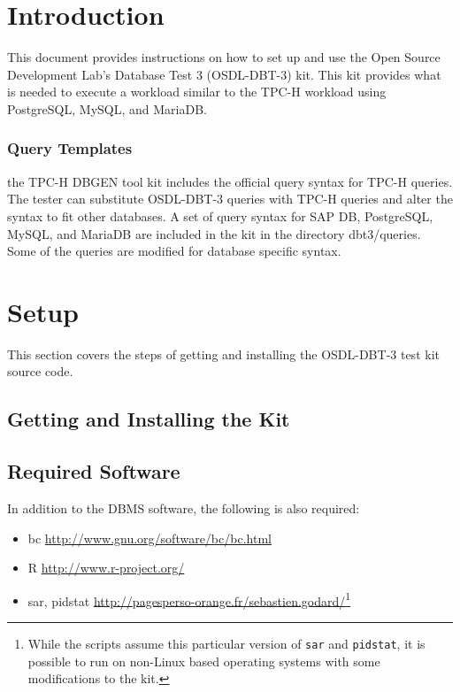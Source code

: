 \documentclass{article}
\begin{document}
\pagebreak

\tableofcontents

\section{Introduction}

This document provides instructions on how to set up and use the
Open Source Development Lab's Database Test 3
(OSDL-DBT-3) kit.  This kit provides what is needed to execute a
workload similar to the TPC-H workload using PostgreSQL, MySQL, and MariaDB.

\subsubsection{Query Templates}

the TPC-H DBGEN tool kit includes the official query syntax for TPC-H queries.
The tester can substitute OSDL-DBT-3 queries with TPC-H queries and alter the
syntax to fit other databases.  A set of query syntax for SAP DB, PostgreSQL,
MySQL, and MariaDB are included in the kit in the directory dbt3/queries.  Some
of the queries are modified for database specific syntax.

\section{Setup}

This section covers the steps of getting and installing the OSDL-DBT-3 test kit
source code.

\subsection{Getting and Installing the Kit}

\subsection{Required Software}

In addition to the DBMS software, the following is also required:
\begin{itemize}
  \item bc \url{http://www.gnu.org/software/bc/bc.html}
  \item R \url{http://www.r-project.org/}
  \item sar, pidstat \url{http://pagesperso-orange.fr/sebastien.godard/}\footnote{While the scripts assume this particular version of \texttt{sar} and \texttt{pidstat}, it is possible to run on non-Linux based operating systems with some modifications to the kit.}
\end{itemize}
\end{document}
